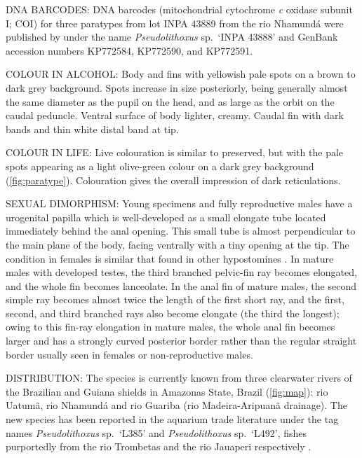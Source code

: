 \documentclass[12pt]{article}
\begin{document}
\noindent DNA BARCODES: DNA barcodes (mitochondrial cytochrome \emph{c} oxidase subunit I; COI) for three paratypes from lot INPA 43889 from the rio Nhamundá were published by \citet{Collins2015} under the name \emph{Pseudolithoxus} sp.\ `INPA 43888' and GenBank accession numbers KP772584, KP772590, and KP772591.\\%
\bigskip

\noindent COLOUR IN ALCOHOL:  Body and fins with yellowish pale spots on a brown to dark grey background. %
Spots increase in size posteriorly, being generally almost the same diameter as the pupil on the head, and as large as the orbit on the caudal peduncle. %
Ventral surface of body lighter, creamy. %
Caudal fin with dark bands and thin white distal band at tip.\\%
\bigskip

\noindent COLOUR IN LIFE: Live colouration is similar to preserved, but with the pale spots appearing as a light olive-green colour on a dark grey background (\autoref{fig:paratype}). %
Colouration gives the overall impression of dark reticulations.\\%
\bigskip

\noindent SEXUAL DIMORPHISM: Young specimens and fully reproductive males have a urogenital papilla which is well-developed as a small elongate tube located immediately behind the anal opening. %
This small tube is almost perpendicular to the main plane of the body, facing ventrally with a tiny opening at the tip. %
The condition in females is similar that found in other hypostomines \citep{Ballen2012,Lujan2015chaeto}. %
In mature males with developed testes, the third branched pelvic-fin ray becomes elongated, and the whole fin becomes lanceolate. %
In the anal fin of mature males, the second simple ray becomes almost twice the length of the first short ray, and the first, second, and third branched rays also become elongate (the third the longest); owing to this fin-ray elongation in mature males, the whole anal fin becomes larger and has a strongly curved posterior border rather than the regular straight border usually seen in females or non-reproductive males.\\%
\bigskip

\noindent DISTRIBUTION: The species is currently known from three clearwater rivers of the Brazilian and Guiana shields in Amazonas State, Brazil (\autoref{fig:map}): rio Uatumã, rio Nhamundá and rio Guariba (rio Madeira-Aripuanã drainage). %
The new species has been reported in the aquarium trade literature under the tag names \emph{Pseudolithoxus} sp.\ `L385' and \emph{Pseudolithoxus} sp.\ `L492', fishes purportedly from the rio Trombetas and the rio Jauaperi  respectively \citep{Dignall2018,Seidel2005}.\\%
\bigskip
\end{document}
